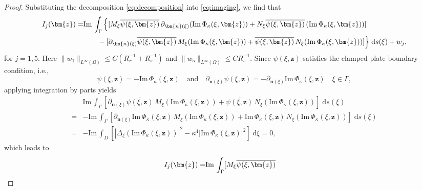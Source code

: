 \documentclass[10pt,a4paper]{article}
\numberwithin{equation}{section}
\begin{document}
\begin{proof}
  Substituting the decomposition \eqref{eq:decomposition} into \eqref{eq:imaging}, we find that
    \begin{align}
    I_j(\bm{ z }) 
    \notag
    = &\mathrm{Im}\, \int_{ \Gamma } \Big\{ [M_{\xi}\overline{\psi(\xi ,\bm{ z })}\, \partial_{\bm{n}(\xi )}
        (\mathrm{Im}\, \Phi_{\kappa}(\xi,\bm{z})  ) 
        +N_{\xi } \overline{\psi(\xi ,\bm{ z })} \,
        (\mathrm{Im}\, \Phi_{\kappa}(\xi,\bm{z}) ) ]  \\
    \label{eq:imaging-1}
   & \qquad - [ \partial_{\bm{n}(\xi )}\overline{\psi(\xi ,\bm{ z })}\,  M_{\xi }
     ( \mathrm{Im}\, \Phi_{\kappa}(\xi,\bm{z})  )
     + \overline{\psi(\xi ,\bm{ z })}\,  N_{\xi }
     ( \mathrm{Im}\, \Phi_{\kappa}(\xi,\bm{z})  )
     ]  \Big\} \;\mathrm{d}s(\xi)
     +w_j,
    \end{align}
    for $j=1,5$. Here $\| w_{1} \|_{L^{\infty}(\Omega)} \leq C(R_r^{-1}+ R_s^{-1})$ and $\| w_{5} \|_{L^{\infty}(\Omega)}
    \leq C R_s^{-1}$.
    Since  $\psi(\xi ,\bm{ z })$ satisfies the clamped plate boundary condition, i.e.,
\begin{equation*}
  \psi(\xi ,\bm{ z }) = -  \mathrm{Im}\, \Phi_{\kappa}(\xi,\bm{z}) \quad \mathrm{ and } \quad
 \partial_{\bm{n}(\xi )} \psi(\xi ,\bm{ z }) = - \partial_{\bm{n}(\xi )} \mathrm{Im}\, \Phi_{\kappa}(\xi,\bm{z}) \quad
  \xi \in \Gamma,
\end{equation*}
    applying integration by parts yields
    \begin{align*}
      &\mathrm{Im}\, \int_{ \Gamma }[ \partial_{\bm{n}(\xi )}\overline{\psi(\xi ,\bm{ z })} \,
        M_{\xi } ( \mathrm{Im}\, \Phi_{\kappa}(\xi,\bm{z})  )
        + \overline{\psi(\xi ,\bm{ z })}\,
        N_{\xi } ( \mathrm{Im}\, \Phi_{\kappa}(\xi,\bm{z})  )
     ] \;\mathrm{d}s(\xi)\\
      =&  - \mathrm{Im}\, \int_{ \Gamma }[ \partial_{\bm{n}(\xi )} \mathrm{Im}\, \Phi_{\kappa}(\xi,\bm{z}) \,
         M_{\xi } ( \mathrm{Im}\, \Phi_{\kappa}(\xi,\bm{z})  )
        + \mathrm{Im}\, \Phi_{\kappa}(\xi,\bm{z}) \,
       N_{\xi }( \mathrm{Im}\, \Phi_{\kappa}(\xi,\bm{z})  )
        ] \;\mathrm{d}s(\xi)\\
        =& - \mathrm{Im}\, \int_{ D} [|\Delta_{\xi } ( \mathrm{Im}\, \Phi_{\kappa}(\xi,\bm{z})  )|^2
        -\kappa^4 |\mathrm{Im}\, \Phi_{\kappa}(\xi,\bm{z})|^2
     ] \;\mathrm{d}\xi =0,
    \end{align*}
    which leads to
        \begin{align*}
    \notag
     I_j(\bm{ z })
          = &\mathrm{Im}\, \int_{ \Gamma }[M_{\xi}\overline{\psi(\xi ,\bm{ z })}\,

\end{align*}
\end{proof}
\end{document}

